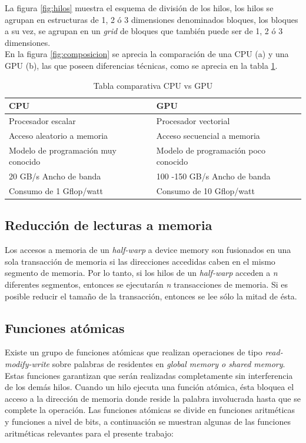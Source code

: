 La figura \ref{fig:hilos} muestra el esquema de división de los hilos, los hilos se agrupan en estructuras de 1, 2 ó 3 dimensiones denominados bloques, los bloques a su vez, se agrupan en un \textit{grid} de bloques que también puede ser de 1, 2 ó 3 dimensiones.\\
En la figura \ref{fig:composicion} se aprecia la comparación de una CPU (a) y una GPU (b), las que poseen diferencias técnicas, como se aprecia en la tabla \ref{tabla_gpu}.\\
\begin{table}
	\begin{center} 
   	\caption{\label{tabla_gpu} Tabla comparativa CPU vs GPU}
	\begin{tabular}{|l|l|}
	\hline 
	\textbf{CPU} & \textbf{GPU} \\ 
	\hline 
	Procesador escalar & Procesador vectorial \\ 
	Acceso aleatorio a memoria & Acceso secuencial a memoria \\  
	Modelo de programación muy conocido & Modelo de programación poco conocido \\  
	20 GB/s Ancho de banda & 100 -150 GB/s Ancho de banda \\  
	Consumo de 1 Gflop/watt & Consumo de 10 Gflop/watt \\ 
	\hline 
	\end{tabular} 
\end{center}
\end{table}

\subsection*{Reducción de lecturas a memoria}

Los accesos a memoria de un \textit{half-warp} a device memory son fusionados en una sola transacción de memoria si las direcciones accedidas caben en el mismo segmento de memoria. Por lo tanto, si los hilos de un \textit{half-warp} acceden a \textit{n} diferentes segmentos, entonces se ejecutarán \textit{n} transacciones de memoria. Si es posible reducir el tamaño de la transacción, entonces se lee sólo la mitad de ésta.

\subsection*{Funciones atómicas}
Existe un grupo de funciones atómicas que realizan operaciones de tipo \textit{read-modify-write} sobre palabras de residentes en \textit{global memory o shared memory}. Estas funciones garantizan que serán realizadas completamente sin interferencia de los demás hilos.
Cuando un hilo ejecuta una función atómica, ésta bloquea el acceso a la dirección de memoria donde reside la palabra involucrada hasta que se complete la operación. Las funciones atómicas se divide en funciones aritméticas y funciones a nivel de bits, a continuación se muestran algunas de las funciones aritméticas relevantes para el presente trabajo:

